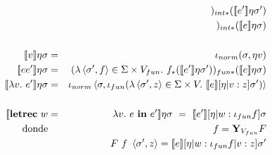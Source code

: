 \begin{eqnarray*}
        && \qquad )_{int*}(\se{e'}\eta\s') \\
        && )_{int*}(\se{e}\eta\s) \\ \\
      \se{v}\eta\s &=& \iota_{norm}(\s, \eta v) \\
      \se{ee'}\eta\s &=& (\lambda \la \s',f\ra \in \Sigma \times V_{fun}.\ f_* (\se{e'}\eta\s'))_{fun*}(\se{e}\eta\s) \\
      \se{\lambda v.\  e'}\eta\s &=&  \iota_{norm}\la \s, \iota_{fun}(\lambda \la\s',z\ra \in \Sigma \times V.\ \se{e}[\eta|v:z]\s')\ra \\ \\
      \se{\textbf{letrec}\ w &=& \lambda v.\  e\ine e'}\eta\s \ = \ \se{e'}[\eta|w:\iota_{fun}f]\s \\
      \text{donde} && f = \textbf{Y}_{V_{fun}}F \\
      && F\ f \ \la\s',z\ra = \se{e}[\eta|w:\iota_{fun} f|v:z]\s'
    \end{eqnarray*}